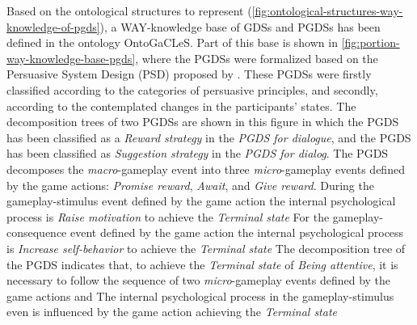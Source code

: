 Based on the ontological structures to represent  (\autoref{fig:ontological-structures-way-knowledge-of-pgds}), a WAY-knowledge base of GDSs and PGDSs has been defined in the ontology OntoGaCLeS. Part of this base is shown in \autoref{fig:portion-way-knowledge-base-pgds}, where the PGDSs were formalized based on the Persuasive System Design (PSD) proposed by .
These PGDSs were firstly classified according to the categories of persuasive principles, and secondly, according to the contemplated changes in the participants' states.
The decomposition trees of two PGDSs are shown in this figure in which the PGDS  has been classified as a \emph{Reward strategy} in the \emph{PGDS for dialogue}, and the PGDS  has been classified as \emph{Suggestion strategy} in the \emph{PGDS for dialog}.
The PGDS  decomposes the \emph{macro}-gameplay event into three \emph{micro}-gameplay events defined by the game actions: \emph{Promise reward}, \emph{Await}, and \emph{Give reward}. During the gameplay-stimulus event defined by the game action  the internal psychological process is \emph{Raise motivation} to achieve the \emph{Terminal state}  For the gameplay-consequence event defined by the game action  the internal psychological process is \emph{Increase self-behavior} to achieve the \emph{Terminal state} 
The decomposition tree of the PGDS  indicates that, to achieve the \emph{Terminal state} of \emph{Being attentive}, it is necessary to follow the sequence of two \emph{micro}-gameplay events defined by the game actions  and 
The internal psychological process  in the gameplay-stimulus even is influenced by the game action  achieving the \emph{Terminal state} 

